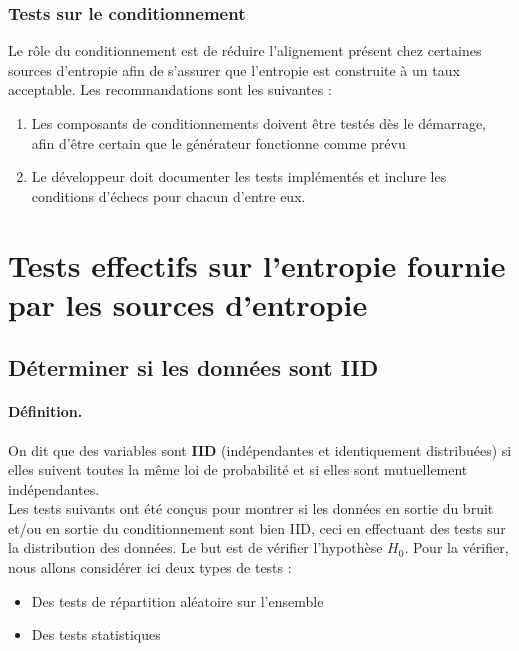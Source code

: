 \subsubsection{Tests sur le conditionnement}
Le rôle du conditionnement est de réduire l'alignement présent chez certaines sources d'entropie afin de s'assurer que l'entropie est construite à un taux acceptable. Les recommandations sont les suivantes :
\begin{enumerate}
\item Les composants de conditionnements doivent être testés dès le démarrage, afin d'être certain que le générateur fonctionne comme prévu
\item Le développeur doit documenter les tests implémentés et inclure les conditions d'échecs pour chacun d'entre eux.
\end{enumerate}



\section{Tests effectifs sur l'entropie fournie par les sources d'entropie}

\subsection{Déterminer si les données sont IID}

\paragraph{Définition.\\}
On dit que des variables sont \textbf{IID} (indépendantes et identiquement distribuées) si elles suivent toutes la même loi de probabilité et si elles sont mutuellement indépendantes. \\

Les tests suivants ont été conçus pour montrer si les données en sortie du bruit et/ou en sortie du conditionnement sont bien IID, ceci en effectuant des tests sur la distribution des données. Le but est de vérifier l'hypothèse $H_0$. Pour la vérifier, nous allons considérer ici deux types de tests : 
\begin{itemize}
\item Des tests de répartition aléatoire sur l'ensemble
\item Des tests statistiques\\
\end{itemize}

